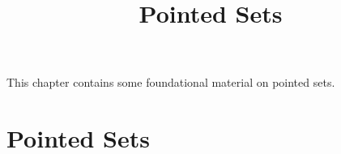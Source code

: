 

%



\title{Pointed Sets}

\maketitle

\label{section-phantom}

This chapter contains some foundational material on pointed sets.

\ChapterTableOfContents

\section{Pointed Sets}\label{section-pointed-sets}

